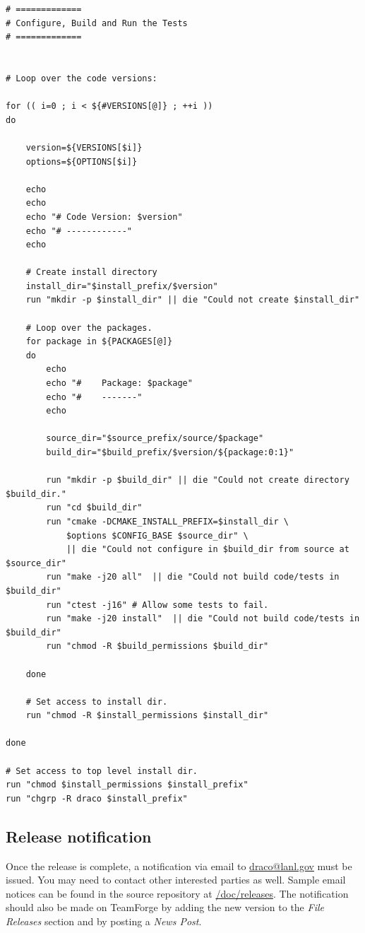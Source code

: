 \documentclass[note]{ResearchNote_pdf}
\begin{document}
\begin{lstlisting}[basicstyle=\footnotesize, xleftmargin=0.20in, 
  xrightmargin=0.20in]
# =============
# Configure, Build and Run the Tests
# =============


# Loop over the code versions:

for (( i=0 ; i < ${#VERSIONS[@]} ; ++i ))
do

    version=${VERSIONS[$i]}
    options=${OPTIONS[$i]}

    echo
    echo
    echo "# Code Version: $version"
    echo "# ------------"
    echo

    # Create install directory
    install_dir="$install_prefix/$version"
    run "mkdir -p $install_dir" || die "Could not create $install_dir"

    # Loop over the packages.
    for package in ${PACKAGES[@]}
    do
        echo
        echo "#    Package: $package"
        echo "#    -------"
        echo
        
        source_dir="$source_prefix/source/$package"
        build_dir="$build_prefix/$version/${package:0:1}"

        run "mkdir -p $build_dir" || die "Could not create directory $build_dir."
        run "cd $build_dir"
        run "cmake -DCMAKE_INSTALL_PREFIX=$install_dir \
            $options $CONFIG_BASE $source_dir" \
            || die "Could not configure in $build_dir from source at $source_dir"
        run "make -j20 all"  || die "Could not build code/tests in $build_dir"
        run "ctest -j16" # Allow some tests to fail.
        run "make -j20 install"  || die "Could not build code/tests in $build_dir"
        run "chmod -R $build_permissions $build_dir"

    done

    # Set access to install dir.
    run "chmod -R $install_permissions $install_dir"

done

# Set access to top level install dir.
run "chmod $install_permissions $install_prefix"
run "chgrp -R draco $install_prefix"
\end{lstlisting}


\subsection{Release notification}
\label{sec:release_notification}

Once the release is complete, a notification via email to
\url{draco@lanl.gov} must be issued.  You may need to contact other
interested parties as well.  Sample email notices can be found in the
source repository at \url{/doc/releases}.  The notification should
also be made on TeamForge by adding the new version to the
\textit{File Releases} section and by posting a \textit{News Post}.
\end{document}
